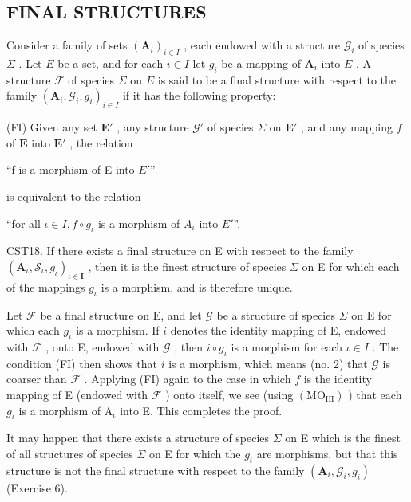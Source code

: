 \subsection{FINAL STRUCTURES}

Consider a family of sets \((\mathbf{A}_{i})_{i\in I}\) , each endowed with a structure \(\mathcal{G}_i\) of species \(\Sigma\) . Let \(E\) be a set, and for each \(i\in I\) let \(g_i\) be a mapping of \(\mathbf{A}_i\) into \(E\) . A structure \(\mathcal{F}\) of species \(\Sigma\) on \(E\) is said to be a final structure with respect to the family \((\mathbf{A}_i,\mathcal{G}_i,g_i)_{i\in I}\) if it has the following property:

(FI) Given any set \(\mathbf{E}'\) , any structure \(\mathcal{G}'\) of species \(\Sigma\) on \(\mathbf{E}'\) , and any mapping \(f\) of \(\mathbf{E}\) into \(\mathbf{E}'\) , the relation

``f is a morphism of E into \(E'\)''

is equivalent to the relation

``for all \(\iota\in I,f\circ g_{\iota}\) is a morphism of \(A_{\iota}\) into \(E'\)''.

CST18. If there exists a final structure on E with respect to the family \((\mathbf{A}_{\iota}, \mathcal{S}_{\iota}, g_{\iota})_{\iota \in \mathbf{I}}\) , then it is the finest structure of species \(\Sigma\) on E for which each of the mappings \(g_{\iota}\) is a morphism, and is therefore unique.

Let \(\mathcal{F}\) be a final structure on E, and let \(\mathcal{G}\) be a structure of species \(\Sigma\) on E for which each \(g_{\iota}\) is a morphism. If \(i\) denotes the identity mapping of E, endowed with \(\mathcal{F}\) , onto E, endowed with \(\mathcal{G}\) , then \(i \circ g_{\iota}\) is a morphism for each \(\iota \in I\) . The condition (FI) then shows that \(i\) is a morphism, which means (no. 2) that \(\mathcal{G}\) is coarser than \(\mathcal{F}\) . Applying (FI) again to the case in which \(f\) is the identity mapping of E (endowed with \(\mathcal{F}\) ) onto itself, we see (using \((\mathrm{MO}_{\mathrm{III}})\) ) that each \(g_{\iota}\) is a morphism of \(\mathrm{A}_{\iota}\) into E. This completes the proof.

It may happen that there exists a structure of species \(\Sigma\) on E which is the finest of all structures of species \(\Sigma\) on E for which the \(g_{i}\) are morphisms, but that this structure is not the final structure with respect to the family \((\mathbf{A}_{i},\mathcal{G}_{i},g_{i})\) (Exercise 6).

